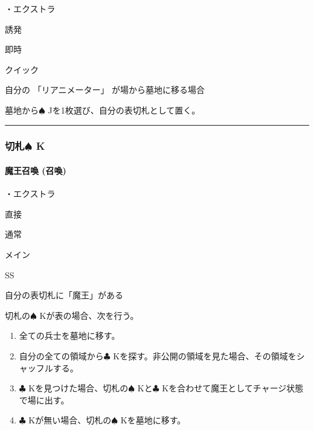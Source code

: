 \documentclass[letterpaper,10pt,dvipdfmx]{sphinxmanual}
\begin{document}
\sphinxAtStartPar
・エクストラ

\sphinxAtStartPar
{} 誘発

\sphinxAtStartPar
{} 即時

\sphinxAtStartPar
{} クイック

\sphinxAtStartPar
{}

\sphinxAtStartPar
自分の 「リアニメーター」 が場から墓地に移る場合

\sphinxAtStartPar
{}

\sphinxAtStartPar
墓地から{\normalsize $\spadesuit$} Jを1枚選び、自分の表切札として置く。


\bigskip\hrule\bigskip



\subsubsection{切札{\normalsize $\spadesuit$} K}
\label{\detokenize{auto/frameActionlist:k}}

\paragraph{魔王召喚 (召喚)}
\label{\detokenize{auto/frameActionlist:act-summondarklord}}\label{\detokenize{auto/frameActionlist:id29}}
\sphinxAtStartPar
{}

\sphinxAtStartPar
・エクストラ

\sphinxAtStartPar
{} 直接

\sphinxAtStartPar
{} 通常

\sphinxAtStartPar
{} メイン

\sphinxAtStartPar
{} SS

\sphinxAtStartPar
{}

\sphinxAtStartPar
自分の表切札に「魔王」がある

\sphinxAtStartPar
{}

\sphinxAtStartPar
切札の{\normalsize $\spadesuit$} Kが表の場合、次を行う。
\begin{enumerate}
%
\item {} 
\sphinxAtStartPar
全ての兵士を墓地に移す。

\item {} 
\sphinxAtStartPar
自分の全ての領域から{\normalsize $\clubsuit$} Kを探す。非公開の領域を見た場合、その領域をシャッフルする。

\item {} 
\sphinxAtStartPar
{\normalsize $\clubsuit$} Kを見つけた場合、切札の{\normalsize $\spadesuit$} Kと{\normalsize $\clubsuit$} Kを合わせて魔王としてチャージ状態で場に出す。

\item {} 
\sphinxAtStartPar
{\normalsize $\clubsuit$} Kが無い場合、切札の{\normalsize $\spadesuit$} Kを墓地に移す。

\end{enumerate}
\end{document}
